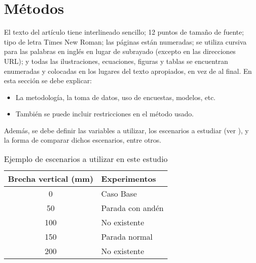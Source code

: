 \section{Métodos}
\label{sec:3}

El texto del artículo tiene interlineado sencillo; 12 puntos de tamaño de fuente; tipo de letra Times New Roman; las páginas están numeradas; se utiliza cursiva para las palabras en inglés en lugar de subrayado (excepto en las direcciones URL); y todas las ilustraciones, ecuaciones, figuras y tablas se encuentran enumeradas y colocadas en los lugares del texto apropiados, en vez de al final.
En esta sección se debe explicar:
\begin{itemize}
    \item La metodología, la toma de datos, uso de encuestas, modelos, etc. 
    \item También se puede incluir restricciones en el método usado. 
\end{itemize}


Además, se debe definir las variables a utilizar, los escenarios a estudiar (ver ), y la forma de comparar dichos escenarios, entre otros.

\begin{table}
  \centering
  \begin{tabular}{cl}
    \toprule
      Brecha vertical (mm) & Experimentos\\
    \midrule
        0 & Caso Base             \\ 
        50 & Parada con andén     \\
        100 & No existente        \\
        150 & Parada normal       \\
        200 & No existente        \\
    \bottomrule
  \end{tabular}
  \caption{Ejemplo de escenarios a utilizar en este estudio}
  \label{tab1} %

\end{table}
